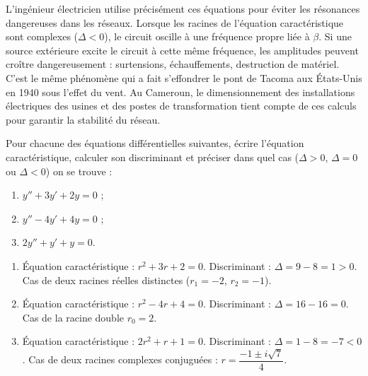 \documentclass[11pt]{article}
\newcommand{\cle}[1]{{\popxbold\color{popdark}#1}}
\begin{document}
\begin{savaistu}
L'ingénieur électricien utilise précisément ces équations pour éviter les \cle{résonances} dangereuses dans les réseaux. Lorsque les racines de l'équation caractéristique sont complexes ($\Delta < 0$), le circuit oscille à une fréquence propre liée à $\beta$. Si une source extérieure excite le circuit à cette même fréquence, les amplitudes peuvent croître dangereusement : surtensions, échauffements, destruction de matériel. C'est le même phénomène qui a fait s'effondrer le pont de Tacoma aux États-Unis en 1940 sous l'effet du vent. Au Cameroun, le dimensionnement des installations électriques des usines et des postes de transformation tient compte de ces calculs pour garantir la stabilité du réseau.
\end{savaistu}

\begin{exercice}
Pour chacune des équations différentielles suivantes, écrire l'équation caractéristique, calculer son discriminant et préciser dans quel cas ($\Delta > 0$, $\Delta = 0$ ou $\Delta < 0$) on se trouve :
\begin{enumerate}
\item $y'' + 3y' + 2y = 0$ ;
\item $y'' - 4y' + 4y = 0$ ;
\item $2y'' + y' + y = 0$.
\end{enumerate}
\end{exercice}

\begin{corrige}
\begin{enumerate}
\item Équation caractéristique : $r^2 + 3r + 2 = 0$. Discriminant : $\Delta = 9 - 8 = 1 > 0$. Cas de deux racines réelles distinctes ($r_1 = -2$, $r_2 = -1$).
\item Équation caractéristique : $r^2 - 4r + 4 = 0$. Discriminant : $\Delta = 16 - 16 = 0$. Cas de la racine double $r_0 = 2$.
\item Équation caractéristique : $2r^2 + r + 1 = 0$. Discriminant : $\Delta = 1 - 8 = -7 < 0$. Cas de deux racines complexes conjuguées : $r = \dfrac{-1 \pm i\sqrt{7}}{4}$.
\end{enumerate}
\end{corrige}
\end{document}

